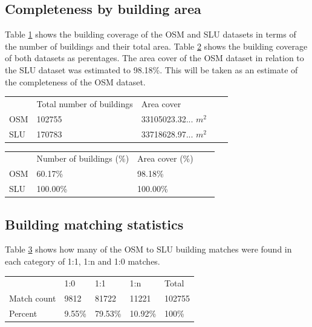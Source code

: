 \documentclass[a4paper]{article}
\begin{document}
\subsection{Completeness by building area}

Table \ref{table:num-of-buildings} shows the building coverage of the OSM and SLU datasets in terms of the number of buildings and their total area.
Table \ref{table:num-of-buildings-percent} shows the building coverage of both datasets as perentages.
The area cover of the OSM dataset in relation to the SLU dataset was estimated to 98.18\%. This will be taken as an estimate of the completeness of the OSM dataset.

\begin{table}[H]
    \begin{tabular}{lllll}
        & Total number of buildings & Area cover \\
        OSM & 102755 & 33105023.32... $m^2$ \\
        SLU & 170783 & 33718628.97... $m^2$
    \end{tabular}
    \label{table:num-of-buildings}
\end{table}

\begin{table}[H]
    \begin{tabular}{lllll}
        & Number of buildings (\%) & Area cover (\%) \\
        OSM & 60.17\% & 98.18\% \\
        SLU & 100.00\% & 100.00\%
    \end{tabular}
    \label{table:num-of-buildings-percent}
\end{table}

\subsection{Building matching statistics}

Table \ref{table:building-matching} shows how many of the OSM to SLU building matches were found in each category of 1:1, 1:n and 1:0 matches.

\begin{table}[H]
    \begin{tabular}{lllll}
        & 1:0 & 1:1 & 1:n & Total \\
        Match count & 9812   & 81722   & 11221   & 102755 \\
        Percent     & 9.55\% & 79.53\% & 10.92\% & 100\%
    \end{tabular}
    \label{table:building-matching}
\end{table}
\end{document}
